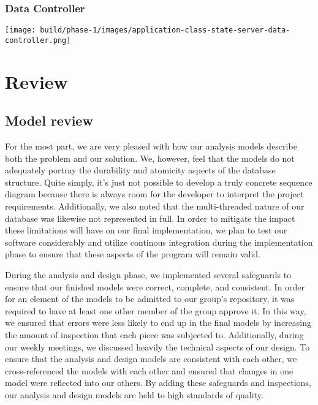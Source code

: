 \documentclass[a4paper]{report}
\begin{document}
	\subsection{Data Controller}
		\texttt{[image: build/phase-1/images/application-class-state-server-data-controller.png]}
	
\chapter{Review}

\section{Model review}

	For the most part, we are very pleased with how our analysis models describe both the problem and our solution. We, however, feel that the models do not adequately portray the durability and atomicity aspects of the database structure. Quite simply, it's just not possible to develop a truly concrete sequence diagram because there is always room for the developer to interpret the project requirements. Additionally, we also noted that the multi-threaded nature of our database was likewise not represented in full. In order to mitigate the impact these limitations will have on our final implementation, we plan to test our software considerably and utilize continous integration during the implementation phase to ensure that these aspects of the program will remain valid.

	During the analysis and design phase, we implemented several safeguards to ensure that our finished models were correct, complete, and consistent. In order for an element of the models to be admitted to our group's repository, it was required to have at least one other member of the group approve it. In this way, we ensured that errors were less likely to end up in the final models by increasing the amount of inspection that each piece was subjected to. Additionally, during our weekly meetings, we discussed heavily the technical aspects of our design. To ensure that the analysis and design models are consistent with each other, we cross-referenced the models with each other and ensured that changes in one model were reflected into our others. By adding these safeguards and inspections, our analysis and design models are held to high standards of quality.
\end{document}
